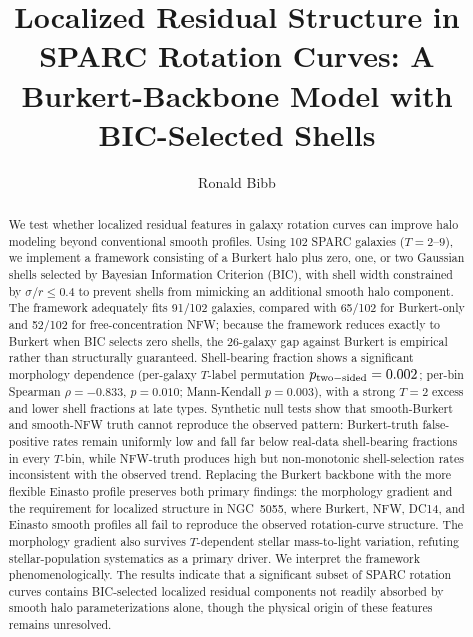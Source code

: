 \documentclass[linenumbers]{aastex701}
\begin{document}
\title{Localized Residual Structure in SPARC Rotation Curves: A Burkert-Backbone Model
with BIC-Selected Shells}

\author[0009-0004-1153-2464]{Ronald Bibb}

\begin{abstract}

We test whether localized residual features in galaxy rotation curves can improve halo modeling beyond conventional smooth profiles. Using 102 SPARC galaxies ($T=2$--$9$), we implement a framework consisting of a Burkert halo plus zero, one, or two Gaussian shells selected by Bayesian Information Criterion (BIC), with shell width constrained by $\sigma/r \le 0.4$ to prevent shells from mimicking an additional smooth halo component. The framework adequately fits 91/102 galaxies, compared with 65/102 for Burkert-only and 52/102 for free-concentration NFW; because the framework reduces exactly to Burkert when BIC selects zero shells, the 26-galaxy gap against Burkert is empirical rather than structurally guaranteed. Shell-bearing fraction shows a significant morphology dependence (per-galaxy $T$-label permutation $p_{\rm two-sided} = 0.002$; per-bin Spearman $\rho = -0.833$, $p = 0.010$; Mann-Kendall $p = 0.003$), with a strong $T=2$ excess and lower shell fractions at late types. Synthetic null tests show that smooth-Burkert and smooth-NFW truth cannot reproduce the observed pattern: Burkert-truth false-positive rates remain uniformly low and fall far below real-data shell-bearing fractions in every $T$-bin, while NFW-truth produces high but non-monotonic shell-selection rates inconsistent with the observed trend. Replacing the Burkert backbone with the more flexible Einasto profile preserves both primary findings: the morphology gradient and the requirement for localized structure in NGC~5055, where Burkert, NFW, DC14, and Einasto smooth profiles all fail to reproduce the observed rotation-curve structure. The morphology gradient also survives $T$-dependent stellar mass-to-light variation, refuting stellar-population systematics as a primary driver. We interpret the framework phenomenologically. The results indicate that a significant subset of SPARC rotation curves contains BIC-selected localized residual components not readily absorbed by smooth halo parameterizations alone, though the physical origin of these features remains unresolved.

\end{abstract}
\end{document}
